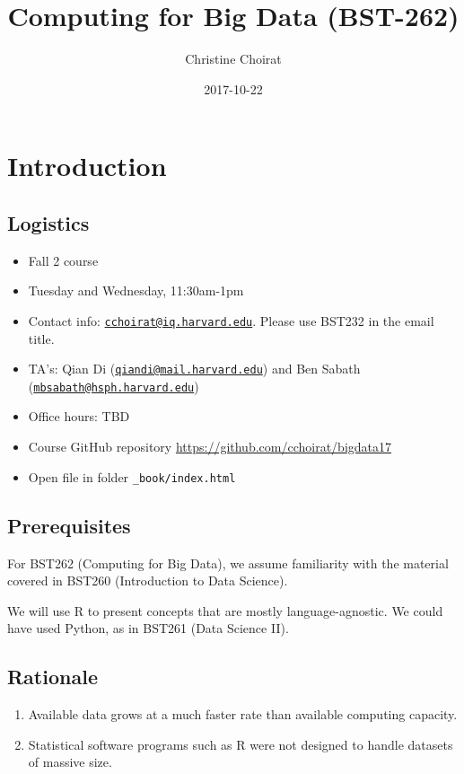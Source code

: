 \documentclass[]{book}
\title{Computing for Big Data (BST-262)}
\author{Christine Choirat}
\date{2017-10-22}
\providecommand{\tightlist}{%
  \setlength{\itemsep}{0pt}\setlength{\parskip}{0pt}}
\theoremstyle{definition}
\theoremstyle{definition}
\theoremstyle{definition}
\theoremstyle{remark}
\begin{document}
\maketitle

{
\setcounter{tocdepth}{1}
\tableofcontents
}
\chapter{Introduction}\label{intro}

\section{Logistics}\label{logistics}

\begin{itemize}
\tightlist
\item
  Fall 2 course
\item
  Tuesday and Wednesday, 11:30am-1pm
\item
  Contact info:
  \href{mailto:cchoirat@iq.harvard.edu}{\nolinkurl{cchoirat@iq.harvard.edu}}.
  Please use BST232 in the email title.
\item
  TA's: Qian Di
  (\href{mailto:qiandi@mail.harvard.edu}{\nolinkurl{qiandi@mail.harvard.edu}})
  and Ben Sabath
  (\href{mailto:mbsabath@hsph.harvard.edu}{\nolinkurl{mbsabath@hsph.harvard.edu}})
\item
  Office hours: TBD
\item
  Course GitHub repository \url{https://github.com/cchoirat/bigdata17}
\item
  Open file in folder \texttt{\_book/index.html}
\end{itemize}

\section{Prerequisites}\label{prerequisites}

For BST262 (Computing for Big Data), we assume familiarity with the
material covered in BST260 (Introduction to Data Science).

We will use R to present concepts that are mostly language-agnostic. We
could have used Python, as in BST261 (Data Science II).

\section{Rationale}\label{rationale}

\begin{enumerate}
\def\labelenumi{\arabic{enumi}.}
\item
  Available data grows at a much faster rate than available computing
  capacity.
\item
  Statistical software programs such as R were not designed to handle
  datasets of massive size.
\end{enumerate}
\end{document}
